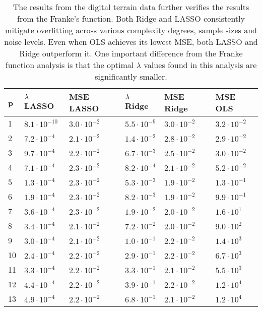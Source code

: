 \documentclass[a4paper,12pt]{article}
\begin{document}
\begin{table}[H]
\caption{The results from the digital terrain data further verifies the results from the Franke's function. Both Ridge and LASSO consistently mitigate overfitting across various complexity degrees, sample sizes and noise levels. Even when OLS achieves its lowest MSE, both LASSO and Ridge outperform it. One important difference from the Franke function analysis is that the optimal $\lambda$ values found in this analysis are significantly smaller.} 
\centering 
\begin{tabular}{l l l l l l} 
\hline\hline 
p  &  $\lambda$ LASSO & MSE LASSO & $\lambda$ Ridge &MSE Ridge&MSE OLS       \\ [0.5ex] 
\hline 
1  &$8.1\cdot 10^{-10}$&$3.0\cdot 10^{-2}$ &$5.5\cdot 10^{-9}$ &$3.0\cdot 10^{-2}$&$3.2\cdot 10^{-2}  $ \\
2  &$7.2\cdot 10^{-4}$&$2.1\cdot 10^{-2}$ &$1.4\cdot 10^{-2}$ &$2.8\cdot 10^{-2}$&$2.9\cdot 10^{-2}  $ \\
3  &$9.7\cdot 10^{-4}$&$2.2\cdot 10^{-2}$ &$6.7\cdot 10^{-3}$ &$2.5\cdot 10^{-2}$&$3.0\cdot 10^{-2}  $ \\
4  &$7.1\cdot 10^{-4}$&$2.3\cdot 10^{-2}$ &$8.2\cdot 10^{-4}$ &$2.1\cdot 10^{-2}$&$5.2\cdot 10^{-2}  $ \\
5  &$1.3\cdot 10^{-4}$&$2.3\cdot 10^{-2}$ &$5.3\cdot 10^{-3}$ &$1.9\cdot 10^{-2}$&$1.3\cdot 10^{-1}  $ \\
6  &$1.9\cdot 10^{-4}$&$2.3\cdot 10^{-2}$ &$8.2\cdot 10^{-3}$ &$1.9\cdot 10^{-2}$&$9.9\cdot 10^{-1}  $ \\
7  &$3.6\cdot 10^{-4}$&$2.3\cdot 10^{-2}$ &$1.9\cdot 10^{-2}$ &$2.0\cdot 10^{-2}$&$1.6\cdot 10^{1}  $ \\
8  &$3.4\cdot 10^{-4}$&$2.1\cdot 10^{-2}$ &$7.2\cdot 10^{-2}$ &$2.0\cdot 10^{-2}$&$9.0\cdot 10^{2}  $ \\
9  &$3.0\cdot 10^{-4}$&$2.1\cdot 10^{-2}$ &$1.0\cdot 10^{-1}$ &$2.2\cdot 10^{-2}$&$1.4\cdot 10^{3}  $ \\
10&$2.4\cdot 10^{-4}$&$2.2\cdot 10^{-2}$ &$2.9\cdot 10^{-1}$ &$2.2\cdot 10^{-2}$&$6.7\cdot 10^{3}  $ \\
11&$3.3\cdot 10^{-4}$&$2.2\cdot 10^{-2}$ &$3.3\cdot 10^{-1}$ &$2.1\cdot 10^{-2}$&$5.5\cdot 10^{3}  $ \\
12&$4.4\cdot 10^{-4}$&$2.2\cdot 10^{-2}$ &$3.9\cdot 10^{-1}$ &$2.2\cdot 10^{-2}$&$1.2\cdot 10^{4}  $ \\
13&$4.9\cdot 10^{-4}$&$2.2\cdot 10^{-2}$ &$6.8\cdot 10^{-1}$ &$2.1\cdot 10^{-2}$&$1.2\cdot 10^{4}  $ \\

\end{tabular}
\end{table}
\end{document}
